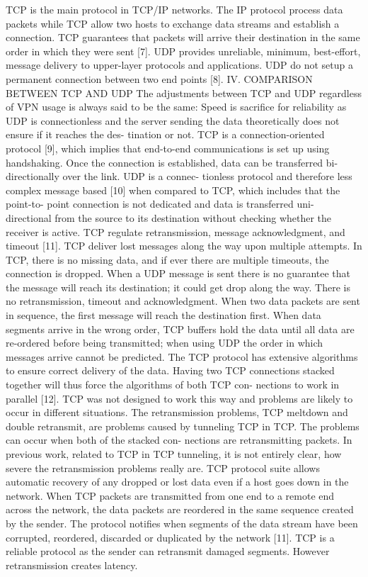 TCP is the main protocol in TCP/IP networks. The IP protocol process data packets while TCP allow two hosts to exchange data streams and establish a connection. TCP guarantees that packets will arrive their destination in the same order in which they were sent [7].
UDP provides unreliable, minimum, best-effort, message delivery to upper-layer protocols and applications. UDP do not setup a permanent connection between two end points [8].
IV. COMPARISON BETWEEN TCP AND UDP
The adjustments between TCP and UDP regardless of VPN usage is always said to be the same: Speed is sacrifice for reliability as UDP is connectionless and the server sending the data theoretically does not ensure if it reaches the des- tination or not. TCP is a connection-oriented protocol [9], which implies that end-to-end communications is set up using handshaking. Once the connection is established, data can be transferred bi-directionally over the link. UDP is a connec- tionless protocol and therefore less complex message based [10] when compared to TCP, which includes that the point-to- point connection is not dedicated and data is transferred uni- directional from the source to its destination without checking whether the receiver is active. TCP regulate retransmission, message acknowledgment, and timeout [11]. TCP deliver lost messages along the way upon multiple attempts. In TCP, there is no missing data, and if ever there are multiple timeouts, the connection is dropped. When a UDP message is sent there is no guarantee that the message will reach its destination; it could get drop along the way. There is no retransmission, timeout and acknowledgment. When two data packets are sent in sequence, the first message will reach the destination first. When data segments arrive in the wrong order, TCP buffers hold the data until all data are re-ordered before being transmitted; when using UDP the order in which messages arrive cannot be predicted.
The TCP protocol has extensive algorithms to ensure correct delivery of the data. Having two TCP connections stacked together will thus force the algorithms of both TCP con- nections to work in parallel [12]. TCP was not designed to work this way and problems are likely to occur in different situations. The retransmission problems, TCP meltdown and double retransmit, are problems caused by tunneling TCP in TCP. The problems can occur when both of the stacked con- nections are retransmitting packets. In previous work, related to TCP in TCP tunneling, it is not entirely clear, how severe the retransmission problems really are. TCP protocol suite allows automatic recovery of any dropped or lost data even if a host goes down in the network. When TCP packets are transmitted from one end to a remote end across the network, the data packets are reordered in the same sequence created by the sender. The protocol notifies when segments of the data stream have been corrupted, reordered, discarded or duplicated by the network [11]. TCP is a reliable protocol as the sender can retransmit damaged segments. However retransmission creates latency.
